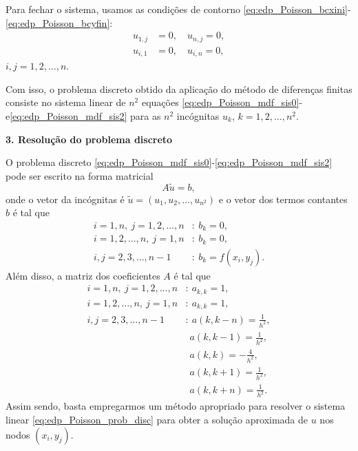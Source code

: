 Para fechar o sistema, usamos as condições de contorno \eqref{eq:edp_Poisson_bcxini}-\eqref{eq:edp_Poisson_bcyfin}:
\begin{align}
  u_{1,j} &= 0,\quad u_{n,j}=0,\label{eq:edp_Poisson_mdf_sis1}\\
  u_{i,1} &= 0,\quad u_{i,n}=0\label{eq:edp_Poisson_mdf_sis2},
\end{align}
$i,j=1, 2, \dotsc, n$.

Com isso, o problema discreto obtido da aplicação do método de diferenças finitas consiste no sistema linear de $n^2$ equações \eqref{eq:edp_Poisson_mdf_sis0}-e\eqref{eq:edp_Poisson_mdf_sis2} para as $n^2$ incógnitas $u_k$, $k=1, 2, \dotsc, n^2$.


\begin{flushleft}
  {\bf 3. Resolução do problema discreto}
\end{flushleft}

O problema discreto \eqref{eq:edp_Poisson_mdf_sis0}-\eqref{eq:edp_Poisson_mdf_sis2} pode ser escrito na forma matricial
\begin{equation}
  A\tilde{u} = b,\label{eq:edp_Poisson_prob_disc}
\end{equation}
onde o vetor da incógnitas é $\tilde{u}=(u_1, u_2, \dotsc, u_{n^2})$ e o vetor dos termos contantes $b$ é tal que
\begin{align}
  i=1,n,~j=1, 2, \dotsc, n &:~b_k = 0,\\
  i=1, 2, \dotsc, n,~j=1,n &:~b_k = 0,\\
  i,j=2, 3, \dotsc, n-1 &:~b_k = f(x_i,y_j).
\end{align}
Além disso, a matriz dos coeficientes $A$ é tal que
\begin{align}
  i=1,n,~j=1, 2, \dotsc, n &:~a_{k,k} = 1,\\
  i=1, 2, \dotsc, n,~j=1,n &:~a_{k,k} = 1,\\
  i,j=2, 3, \dotsc, n-1 &:~a(k,k-n)=\frac{1}{h^2},\\
                        &~~a(k,k-1)=\frac{1}{h^2},\\
                        &~~a(k,k)=-\frac{4}{h^2},\\
                        &~~a(k,k+1)=\frac{1}{h^2},\\
                        &~~a(k,k+n)=\frac{1}{h^2}.
\end{align}
Assim sendo, basta empregarmos um método apropriado para resolver o sistema linear \eqref{eq:edp_Poisson_prob_disc} para obter a solução aproximada de $u$ nos nodos $(x_i, y_j)$.


